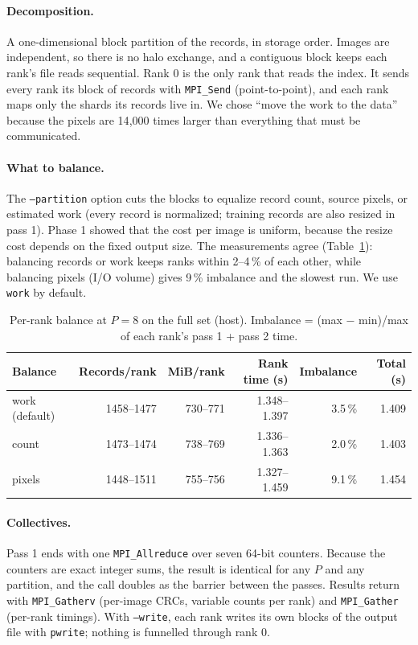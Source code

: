\documentclass{zc-ust-hw}
\begin{document}
\paragraph{Decomposition.} A one-dimensional block partition of the records, in storage order.
Images are independent, so there is no halo exchange, and a contiguous block keeps each rank's
file reads sequential. Rank 0 is the only rank that reads the index. It sends every rank its
block of records with \texttt{MPI\_Send} (point-to-point), and each rank maps only the shards
its records live in. We chose ``move the work to the data'' because the pixels are 14{,}000
times larger than everything that must be communicated.

\paragraph{What to balance.} The \texttt{--partition} option cuts the blocks to equalize record
count, source pixels, or estimated work (every record is normalized; training records are also
resized in pass 1). Phase 1 showed that the cost per image is uniform, because the resize cost
depends on the fixed output size. The measurements agree (Table~\ref{tab:part}): balancing
records or work keeps ranks within 2--4\,\% of each other, while balancing pixels (I/O volume)
gives 9\,\% imbalance and the slowest run. We use \texttt{work} by default.

\begin{table}[H]
\centering\small
\begin{tabular}{lrrrrr}
\toprule
Balance & Records/rank & MiB/rank & Rank time (s) & Imbalance & Total (s) \\
\midrule
work (default) & 1458--1477 & 730--771 & 1.348--1.397 & 3.5\,\% & 1.409 \\
count & 1473--1474 & 738--769 & 1.336--1.363 & 2.0\,\% & 1.403 \\
pixels & 1448--1511 & 755--756 & 1.327--1.459 & 9.1\,\% & 1.454 \\
\bottomrule
\end{tabular}
\caption{Per-rank balance at $P=8$ on the full set (host). Imbalance = (max $-$ min)/max of each
rank's pass 1 + pass 2 time.}
\label{tab:part}
\end{table}

\paragraph{Collectives.} Pass 1 ends with one \texttt{MPI\_Allreduce} over seven 64-bit
counters. Because the counters are exact integer sums, the result is identical for any $P$ and
any partition, and the call doubles as the barrier between the passes. Results return with
\texttt{MPI\_Gatherv} (per-image CRCs, variable counts per rank) and \texttt{MPI\_Gather}
(per-rank timings). With \texttt{--write}, each rank writes its own blocks of the output file
with \texttt{pwrite}; nothing is funnelled through rank 0.
\end{document}
